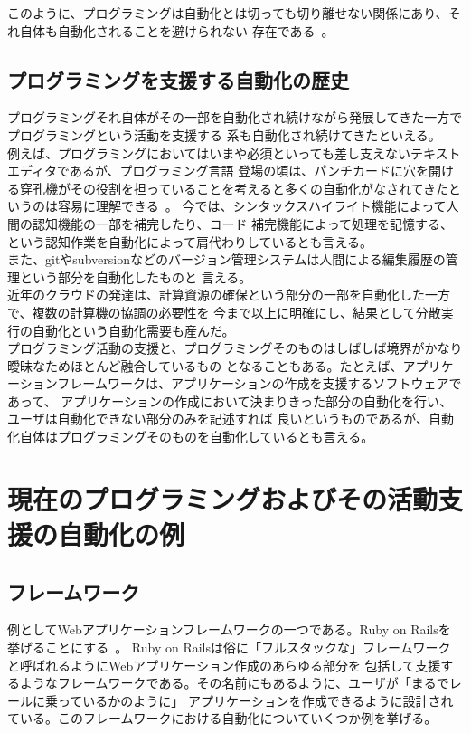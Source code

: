\documentclass[10pt,a4paper]{ltjsarticle}       %
\begin{document}
このように、プログラミングは自動化とは切っても切り離せない関係にあり、それ自体も自動化されることを避けられない
存在である~\cite{plmaking}。
\subsection{プログラミングを支援する自動化の歴史}
プログラミングそれ自体がその一部を自動化され続けながら発展してきた一方でプログラミングという活動を支援する
系も自動化され続けてきたといえる。\\

例えば、プログラミングにおいてはいまや必須といっても差し支えないテキストエディタであるが、プログラミング言語
登場の頃は、パンチカードに穴を開ける穿孔機がその役割を担っていることを考えると多くの自動化がなされてきたと
いうのは容易に理解できる~\cite{punchcard}。
今では、シンタックスハイライト機能によって人間の認知機能の一部を補完したり、コード
補完機能によって処理を記憶する、という認知作業を自動化によって肩代わりしているとも言える。\\
また、gitやsubversionなどのバージョン管理システムは人間による編集履歴の管理という部分を自動化したものと
言える。\\
近年のクラウドの発達は、計算資源の確保という部分の一部を自動化した一方で、複数の計算機の協調の必要性を
今まで以上に明確にし、結果として分散実行の自動化という自動化需要も産んだ。\\

プログラミング活動の支援と、プログラミングそのものはしばしば境界がかなり曖昧なためほとんど融合しているもの
となることもある。たとえば、アプリケーションフレームワークは、アプリケーションの作成を支援するソフトウェアであって、
アプリケーションの作成において決まりきった部分の自動化を行い、ユーザは自動化できない部分のみを記述すれば
良いというものであるが、自動化自体はプログラミングそのものを自動化しているとも言える。\\
\section{現在のプログラミングおよびその活動支援の自動化の例}
\subsection{フレームワーク}
例としてWebアプリケーションフレームワークの一つである。Ruby on Railsを挙げることにする~\cite{RubyOnRails}。
Ruby on Railsは俗に「フルスタックな」フレームワークと呼ばれるようにWebアプリケーション作成のあらゆる部分を
包括して支援するようなフレームワークである。その名前にもあるように、ユーザが「まるでレールに乗っているかのように」
アプリケーションを作成できるように設計されている。このフレームワークにおける自動化についていくつか例を挙げる。\\
\end{document}

